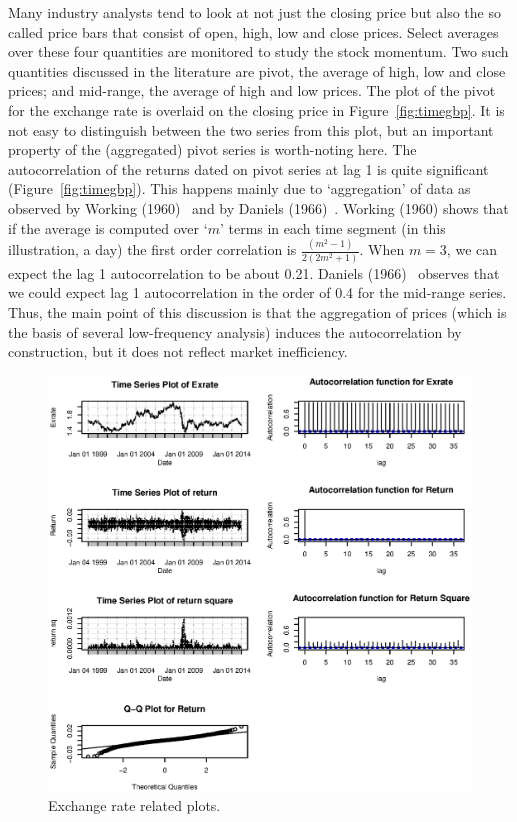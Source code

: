 Many industry analysts tend to look at not just the closing price but also the so called price bars that consist of open, high, low and close prices. Select averages over these four quantities are monitored to study the stock momentum. Two such quantities discussed in the literature are pivot, the average of high, low and close prices; and mid-range, the average of high and low prices. The plot of the pivot for the exchange rate is overlaid on the closing price in Figure~\ref{fig:timegbp}. It is not easy to distinguish between the two series from this plot, but an important property of the (aggregated) pivot series is worth-noting here. The autocorrelation of the returns dated on pivot series at lag 1 is quite significant (Figure~\ref{fig:timegbp}). This happens mainly due to `aggregation' of data as observed by Working (1960)~\cite{working1960note} and by Daniels (1966)~\cite{daniels1966autocorrelation}. Working (1960) \cite{working1960note} shows that if the average is computed over `$m$' terms in each time segment (in this illustration, a day) the first order correlation is $\frac{(m^2-1)}{2(2m^2+1)}$. When $m= 3$, we can expect the lag 1 autocorrelation to be about 0.21. Daniels (1966)~\cite{daniels1966autocorrelation} observes that we could expect lag 1 autocorrelation in the order of 0.4 for the mid-range series. Thus, the main point of this discussion is that the aggregation of prices (which is the basis of several low-frequency analysis) induces the autocorrelation by construction, but it does not reflect market inefficiency.
	\begin{figure}[!ht]
	\centering
	\includegraphics[width=\textwidth]{chapters/chapter_uvts/figures/31graphs.eps}
	\caption{Exchange rate related plots.\label{fig:exchrate}}
	\end{figure}

